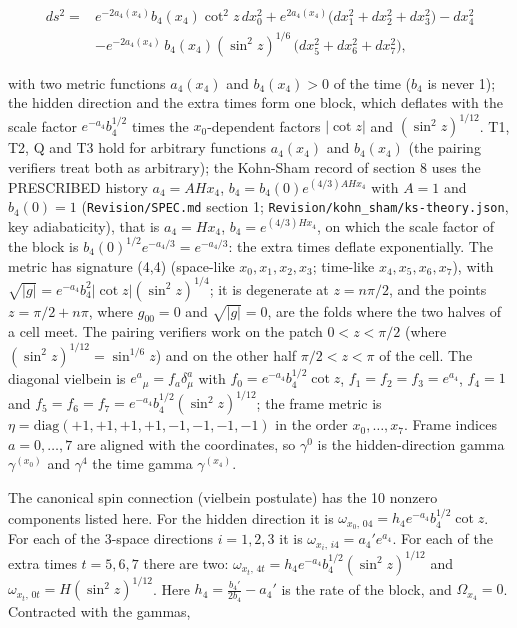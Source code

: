 \documentclass[11pt]{article}
\begin{document}
\[
\begin{aligned}
ds^2 = {} & e^{-2a_4(x_4)}b_4(x_4)\cot^2 z\,dx_0^2 + e^{2a_4(x_4)}\big(dx_1^2+dx_2^2+dx_3^2\big) - dx_4^2 \\
& - e^{-2a_4(x_4)}\,b_4(x_4)(\sin^2 z)^{1/6}\,\big(dx_5^2+dx_6^2+dx_7^2\big) ,
\end{aligned}
\]

with two metric functions $a_4(x_4)$ and $b_4(x_4) > 0$ of the time ($b_4$ is never 1); the hidden direction and the extra times form one block, which deflates with the scale factor $e^{-a_4}b_4^{1/2}$ times the $x_0$-dependent factors $|\cot z|$ and $(\sin^2 z)^{1/12}$. T1, T2, Q and T3 hold for arbitrary functions $a_4(x_4)$ and $b_4(x_4)$ (the pairing verifiers treat both as arbitrary); the Kohn-Sham record of section 8 uses the PRESCRIBED history $a_4 = AHx_4$, $b_4 = b_4(0)e^{(4/3)AHx_4}$ with $A = 1$ and $b_4(0) = 1$ (\texttt{Revision\allowbreak{}/SPEC.md} section 1; \texttt{Revision\allowbreak{}/kohn\_sh\allowbreak{}am/ks-th\allowbreak{}eory.jso\allowbreak{}n}, key adiabaticity), that is $a_4 = Hx_4$, $b_4 = e^{(4/3)Hx_4}$, on which the scale factor of the block is $b_4(0)^{1/2}e^{-a_4/3} = e^{-a_4/3}$: the extra times deflate exponentially. The metric has signature (4,4) (space-like $x_0, x_1, x_2, x_3$; time-like $x_4, x_5, x_6, x_7$), with $\sqrt{|g|} = e^{-a_4}b_4^2|\cot z|(\sin^2 z)^{1/4}$; it is degenerate at $z = n\pi/2$, and the points $z = \pi/2 + n\pi$, where $g_{00} = 0$ and $\sqrt{|g|} = 0$, are the folds where the two halves of a cell meet. The pairing verifiers work on the patch $0 < z < \pi/2$ (where $(\sin^2 z)^{1/12} = \sin^{1/6}z$) and on the other half $\pi/2 < z < \pi$ of the cell. The diagonal vielbein is $e^a{}_\mu = f_a\delta^a_\mu$ with $f_0 = e^{-a_4}b_4^{1/2}\cot z$, $f_1 = f_2 = f_3 = e^{a_4}$, $f_4 = 1$ and $f_5 = f_6 = f_7 = e^{-a_4}b_4^{1/2}(\sin^2 z)^{1/12}$; the frame metric is $\eta = \mathrm{diag}(+1,+1,+1,+1,-1,-1,-1,-1)$ in the order $x_0, \dots, x_7$. Frame indices $a = 0, \dots, 7$ are aligned with the coordinates, so $\gamma^0$ is the hidden-direction gamma $\gamma^{(x_0)}$ and $\gamma^4$ the time gamma $\gamma^{(x_4)}$.

The canonical spin connection (vielbein postulate) has the 10 nonzero components listed here. For the hidden direction it is $\omega_{x_0,\,04} = h_4e^{-a_4}b_4^{1/2}\cot z$. For each of the 3-space directions $i = 1, 2, 3$ it is $\omega_{x_i,\,i4} = a_4'e^{a_4}$. For each of the extra times $t = 5, 6, 7$ there are two: $\omega_{x_t,\,4t} = h_4e^{-a_4}b_4^{1/2}(\sin^2 z)^{1/12}$ and $\omega_{x_t,\,0t} = H(\sin^2 z)^{1/12}$. Here $h_4 = \frac{b_4'}{2b_4} - a_4'$ is the rate of the block, and $\Omega_{x_4} = 0$. Contracted with the gammas,
\end{document}

